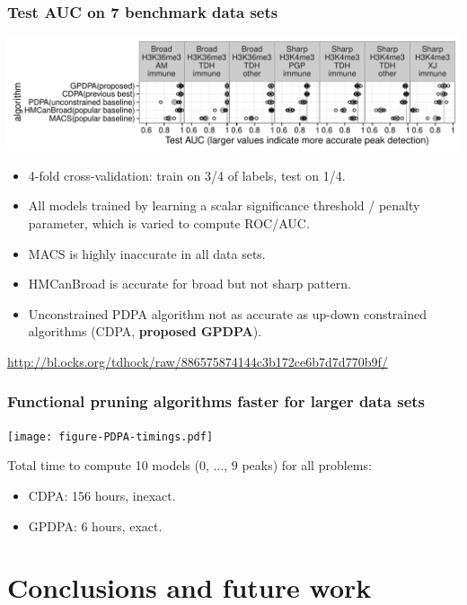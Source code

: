 \documentclass{beamer}
\begin{document}
\begin{frame}
  \frametitle{Test AUC on 7 benchmark data sets}
  \includegraphics[width=\textwidth]{figure-test-error-dots}
  \begin{itemize}
  \item 4-fold cross-validation: train on 3/4 of labels, test on 1/4.
  \item All models trained by learning a scalar significance
    threshold / penalty parameter, which is varied to compute ROC/AUC.
  \item MACS is highly inaccurate in all data sets.
  \item HMCanBroad is accurate for broad but not sharp pattern.
  \item Unconstrained PDPA algorithm not as accurate as up-down
    constrained algorithms (CDPA, \textbf{proposed GPDPA}).
  \end{itemize}
  \scriptsize
\url{http://bl.ocks.org/tdhock/raw/886575874144c3b172ce6b7d7d770b9f/}
\end{frame}

\begin{frame}
  \frametitle{Functional pruning algorithms faster for larger data sets}
  \texttt{[image: figure-PDPA-timings.pdf]}

  Total time to compute 10 models (0, ..., 9 peaks) for all problems:
  \begin{itemize}
  \item CDPA: 156 hours, inexact.
  \item GPDPA: 6 hours, exact.
  \end{itemize}
\end{frame}

\section{Conclusions and future work}
\end{document}

